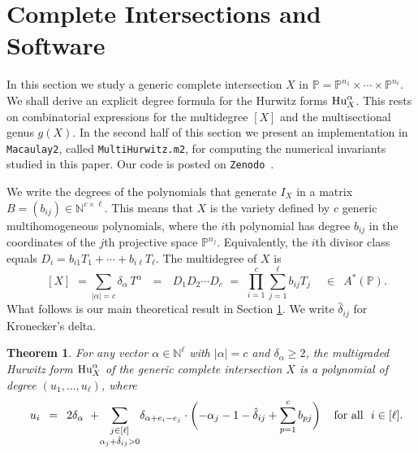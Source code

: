 \documentclass[12pt]{article}
\newtheorem{theorem}{Theorem}[section]
\theoremstyle{definition}
\newcommand{\bN}{\mathbb N}
\newcommand{\bP}{\mathbb P}
\begin{document}
\section{Complete Intersections and Software}
\label{sec4}

In this section we study a generic complete intersection $X$ in
$\bP = \bP^{n_1} \times \cdots \times \bP^{n_\ell}$. We shall derive an explicit 
degree formula for the Hurwitz forms ${\rm Hu}^\alpha_X$.
This rests on
combinatorial expressions for the multidegree $[X]$ and the multisectional genus $g(X)$.
In the second half of this section we present an
implementation in {\tt Macaulay2},
called  {\tt MultiHurwitz.m2}, for computing the numerical invariants studied in this paper.
Our code is posted on {\tt Zenodo}~\cite{zenodo}.


We write the degrees of the polynomials that generate $I_X$ in a matrix $B = (b_{ij}) \in \bN^{c \times \ell}$.
This means that $X$ is the variety defined by $c$ generic multihomogeneous polynomials,
where the $i$th polynomial has degree $b_{ij}$ in the coordinates of the
$j$th projective space $\bP^{n_j}$. Equivalently, the $i$th divisor class equals
$D_i = b_{i1} T_1 + \cdots + b_{i\ell} T_\ell$.
The multidegree of $X$ is
\begin{equation}
\label{eq:mdCI} \quad
[X] \,\, = \sum_{|\alpha|=c} \delta_\alpha\,T^{\alpha} \,\,\,\, = \,\,\,\, D_1 D_2 \cdots D_c \,\, = \,\,
\prod_{i=1}^c \sum_{j=1}^\ell b_{ij} T_j \,\quad \in \,\,\, A^*(\bP).
\end{equation}
What follows  is our main theoretical result in Section \ref{sec4}.
We write $\hat\delta_{ij}$ for Kronecker's delta.

\begin{theorem} \label{thm:CIformula}
For any vector $\alpha \in \bN^\ell$ with $|\alpha| = c$ and $\delta_\alpha \geq 2$,
the multigraded Hurwitz form ${\rm Hu}^\alpha_X$ of the generic complete intersection $X$
is a polynomial of degree $(u_1,\ldots,u_\ell)$, where
\begin{equation}
\label{eq:CIui}
     \quad u_i \,\,\,= \,\,\,2 \delta_\alpha  \, \, +\!
     \sum_{\substack{j\in[\ell]\\\alpha_j+\hat{\delta}_{ij}>0}} 
     \! \delta_{\alpha+e_i-e_j} \cdot \biggl(-\alpha_j-1-\hat{\delta}_{ij}+\sum_{p=1}^c b_{pj} \biggr)\,
\quad \hbox{for all}\,\,\, \,i \in [\ell] .
\end{equation}
\end{theorem}
\end{document}
